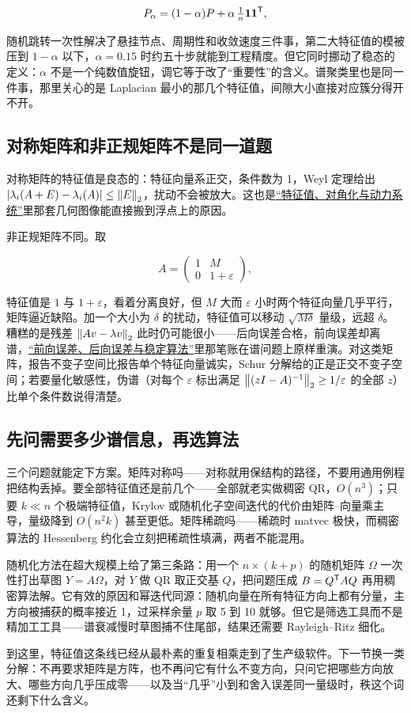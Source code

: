 \[
P_\alpha=(1-\alpha)P+\alpha\,\tfrac1n\mathbf{1}\mathbf{1}^{\mathsf{T}},
\]

随机跳转一次性解决了悬挂节点、周期性和收敛速度三件事，第二大特征值的模被压到 \(1-\alpha\) 以下，\(\alpha=0.15\) 时约五十步就能到工程精度。但它同时挪动了稳态的定义：\(\alpha\) 不是一个纯数值旋钮，调它等于改了``重要性''的含义。谱聚类里也是同一件事，那里关心的是 Laplacian 最小的那几个特征值，间隙大小直接对应簇分得开不开。

\subsection{对称矩阵和非正规矩阵不是同一道题}

对称矩阵的特征值是良态的：特征向量系正交，条件数为 1，Weyl 定理给出 \(\left|\lambda_i(A+E)-\lambda_i(A)\right|\le\left\lVert E\right\rVert_2\)，扰动不会被放大。这也是\hyperref[ch:020]{``特征值、对角化与动力系统''}里那套几何图像能直接搬到浮点上的原因。

非正规矩阵不同。取

\[
A=\begin{pmatrix}1&M\\0&1+\varepsilon\end{pmatrix},
\]

特征值是 \(1\) 与 \(1+\varepsilon\)，看着分离良好，但 \(M\) 大而 \(\varepsilon\) 小时两个特征向量几乎平行，矩阵逼近缺陷。加一个大小为 \(\delta\) 的扰动，特征值可以移动 \(\sqrt{M\delta}\) 量级，远超 \(\delta\)。糟糕的是残差 \(\left\lVert Av-\lambda v\right\rVert_2\) 此时仍可能很小——后向误差合格，前向误差却离谱，\hyperref[sec:08-Numerical-Analysis/01-Floating-Point-and-Error/04]{``前向误差、后向误差与稳定算法''}里那笔账在谱问题上原样重演。对这类矩阵，报告不变子空间比报告单个特征向量诚实，Schur 分解给的正是正交不变子空间；若要量化敏感性，伪谱（对每个 \(\varepsilon\) 标出满足 \(\left\lVert(zI-A)^{-1}\right\rVert_2\ge1/\varepsilon\) 的全部 \(z\)）比单个条件数说得清楚。

\subsection{先问需要多少谱信息，再选算法}

三个问题就能定下方案。矩阵对称吗——对称就用保结构的路径，不要用通用例程把结构丢掉。要全部特征值还是前几个——全部就老实做稠密 QR，\(O(n^3)\)；只要 \(k\ll n\) 个极端特征值，Krylov 或随机化子空间迭代的代价由矩阵--向量乘主导，量级降到 \(O(n^2k)\) 甚至更低。矩阵稀疏吗——稀疏时 matvec 极快，而稠密算法的 Hessenberg 约化会立刻把稀疏性填满，两者不能混用。

随机化方法在超大规模上给了第三条路：用一个 \(n\times(k+p)\) 的随机矩阵 \(\Omega\) 一次性打出草图 \(Y=A\Omega\)，对 \(Y\) 做 QR 取正交基 \(Q\)，把问题压成 \(B=Q^{\mathsf{T}}AQ\) 再用稠密算法解。它有效的原因和幂迭代同源：随机向量在所有特征方向上都有分量，主方向被捕获的概率接近 1，过采样余量 \(p\) 取 5 到 10 就够。但它是筛选工具而不是精加工工具——谱衰减慢时草图捕不住尾部，结果还需要 Rayleigh--Ritz 细化。

到这里，特征值这条线已经从最朴素的重复相乘走到了生产级软件。下一节换一类分解：不再要求矩阵是方阵，也不再问它有什么不变方向，只问它把哪些方向放大、哪些方向几乎压成零——以及当``几乎''小到和舍入误差同一量级时，秩这个词还剩下什么含义。
